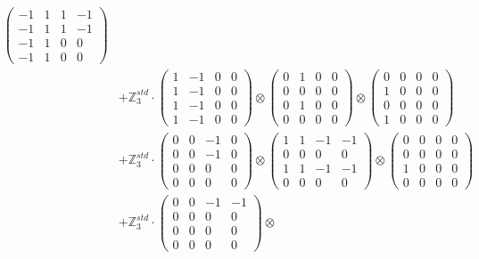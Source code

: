 \documentclass{article}
\begin{document}
{\begin{align}
            \begin{pmatrix} -1 & 1 & 1 & -1 \\ -1 & 1 & 1 & -1 \\ -1 & 1 & 0 & 0 \\ -1 & 1 & 0 & 0 \end{pmatrix} \\ 
        &+ \label{Rs16-Rc11-Solution-2-c25} \mathbb{Z}_3^{std} \cdot 
            \begin{pmatrix} 1 & -1 & 0 & 0 \\ 1 & -1 & 0 & 0 \\ 1 & -1 & 0 & 0 \\ 1 & -1 & 0 & 0 \end{pmatrix} \otimes 
            \begin{pmatrix} 0 & 1 & 0 & 0 \\ 0 & 0 & 0 & 0 \\ 0 & 1 & 0 & 0 \\ 0 & 0 & 0 & 0 \end{pmatrix} \otimes 
            \begin{pmatrix} 0 & 0 & 0 & 0 \\ 1 & 0 & 0 & 0 \\ 0 & 0 & 0 & 0 \\ 1 & 0 & 0 & 0 \end{pmatrix} \\ 
        &+ \label{Rs16-Rc11-Solution-2-c26} \mathbb{Z}_3^{std} \cdot 
            \begin{pmatrix} 0 & 0 & -1 & 0 \\ 0 & 0 & -1 & 0 \\ 0 & 0 & 0 & 0 \\ 0 & 0 & 0 & 0 \end{pmatrix} \otimes 
            \begin{pmatrix} 1 & 1 & -1 & -1 \\ 0 & 0 & 0 & 0 \\ 1 & 1 & -1 & -1 \\ 0 & 0 & 0 & 0 \end{pmatrix} \otimes 
            \begin{pmatrix} 0 & 0 & 0 & 0 \\ 0 & 0 & 0 & 0 \\ 1 & 0 & 0 & 0 \\ 0 & 0 & 0 & 0 \end{pmatrix} \\ 
        &+ \label{Rs16-Rc11-Solution-2-c27} \mathbb{Z}_3^{std} \cdot 
            \begin{pmatrix} 0 & 0 & -1 & -1 \\ 0 & 0 & 0 & 0 \\ 0 & 0 & 0 & 0 \\ 0 & 0 & 0 & 0 \end{pmatrix} \otimes 

\end{align}}
\end{document}
